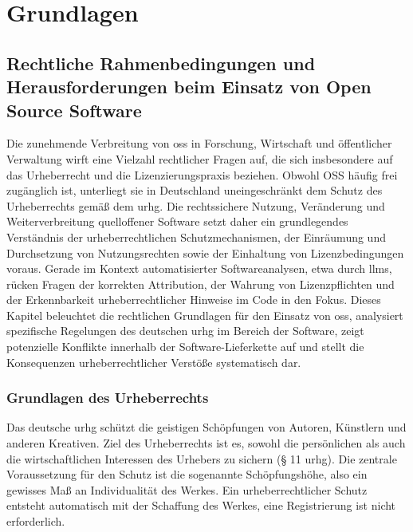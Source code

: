 \chapter{Grundlagen}\label{ch:grundlagen}


\section{Rechtliche Rahmenbedingungen und Herausforderungen beim Einsatz von Open Source Software}\label{sec:rechtliches}

Die zunehmende Verbreitung von \gls{oss} in Forschung, Wirtschaft und öffentlicher Verwaltung wirft eine Vielzahl rechtlicher Fragen auf, die sich insbesondere auf das Urheberrecht und die Lizenzierungspraxis beziehen.
Obwohl OSS häufig frei zugänglich ist, unterliegt sie in Deutschland uneingeschränkt dem Schutz des Urheberrechts gemäß dem \gls{urhg}.
Die rechtssichere Nutzung, Veränderung und Weiterverbreitung quelloffener Software setzt daher ein grundlegendes Verständnis der urheberrechtlichen Schutzmechanismen, der Einräumung und Durchsetzung von Nutzungsrechten sowie der Einhaltung von Lizenzbedingungen voraus.
Gerade im Kontext automatisierter Softwareanalysen, etwa durch \glspl{llm}, rücken Fragen der korrekten Attribution, der Wahrung von Lizenzpflichten und der Erkennbarkeit urheberrechtlicher Hinweise im Code in den Fokus.
Dieses Kapitel beleuchtet die rechtlichen Grundlagen für den Einsatz von \gls{oss}, analysiert spezifische Regelungen des deutschen \gls{urhg} im Bereich der Software, zeigt potenzielle Konflikte innerhalb der Software-Lieferkette auf und stellt die Konsequenzen urheberrechtlicher Verstöße systematisch dar.


\subsection{Grundlagen des Urheberrechts}

Das deutsche \acrlong{urhg} schützt die geistigen Schöpfungen von Autoren, Künstlern und anderen Kreativen.
Ziel des Urheberrechts ist es, sowohl die persönlichen als auch die wirtschaftlichen Interessen des Urhebers zu sichern (§ 11 \gls{urhg}).
Die zentrale Voraussetzung für den Schutz ist die sogenannte Schöpfungshöhe, also ein gewisses Maß an Individualität des Werkes.
Ein urheberrechtlicher Schutz entsteht automatisch mit der Schaffung des Werkes, eine Registrierung ist nicht erforderlich.

